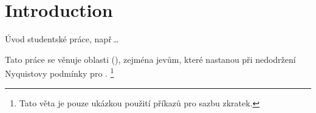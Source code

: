\chapter*{Introduction}
{}


Úvod studentské práce, např\,\dots

Tato práce se věnuje oblasti  (), zejména jevům, které nastanou při nedodržení Nyquistovy podmínky pro .%
\footnote{Tato věta je pouze ukázkou použití příkazů pro sazbu zkratek.}